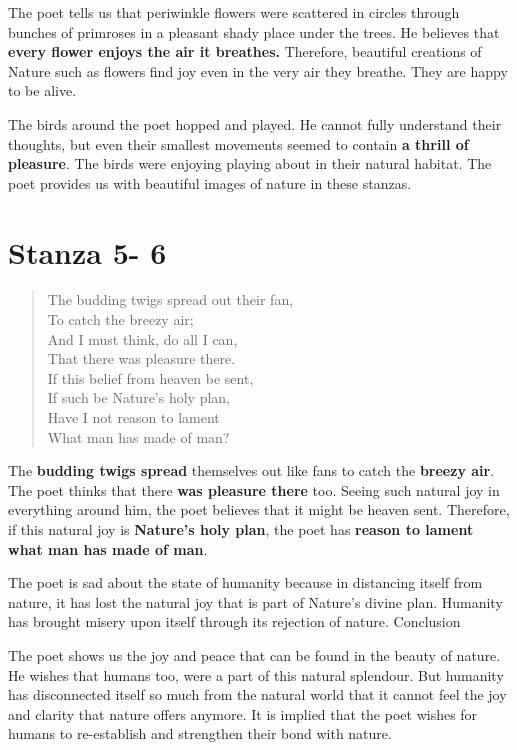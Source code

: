 \documentclass[a4paper,12pt]{book}
\begin{document}
The poet tells us that periwinkle flowers were scattered in circles through bunches of primroses in a pleasant shady place under the trees. He believes that \textbf{every flower enjoys the air it breathes.} Therefore, beautiful creations of Nature such as flowers find joy even in the very air they breathe. They are happy to be alive.

The birds around the poet hopped and played. He cannot fully understand their thoughts, but even their smallest movements seemed to contain \textbf{a thrill of pleasure}. The birds were enjoying playing about in their natural habitat. The poet provides us with beautiful images of nature in these stanzas.

\section{Stanza 5- 6}
\label{sec:orgdc111ee}

\begin{verse}
The budding twigs spread out their fan,\\[0pt]
To catch the breezy air;\\[0pt]
And I must think, do all I can,\\[0pt]
That there was pleasure there.\\[0pt]
If this belief from heaven be sent,\\[0pt]
If such be Nature’s holy plan,\\[0pt]
Have I not reason to lament\\[0pt]
What man has made of man?\\[0pt]
\end{verse}

The \textbf{budding twigs spread} themselves out like fans to catch the \textbf{breezy air}. The poet thinks that there \textbf{was pleasure there} too. Seeing such natural joy in everything around him, the poet believes that it might be heaven sent. Therefore, if this natural joy is \textbf{Nature’s holy plan}, the poet has \textbf{reason to lament what man has made of man}.

The poet is sad about the state of humanity because in distancing itself from nature, it has lost the natural joy that is part of Nature’s divine plan. Humanity has brought misery upon itself through its rejection of nature.
Conclusion

The poet shows us the joy and peace that can be found in the beauty of nature. He wishes that humans too, were a part of this natural splendour. But humanity has disconnected itself so much from the natural world that it cannot feel the joy and clarity that nature offers anymore. It is implied that the poet wishes for humans to re-establish and strengthen their bond with nature.
\end{document}
